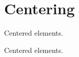 \documentclass{article}
\begin{document}
\section*{Centering}

\bigskip

\begin{center}
    \noindent Centered elements.
\end{center}

{\centering
    \noindent Centered elements.
    \par
}
\end{document}
